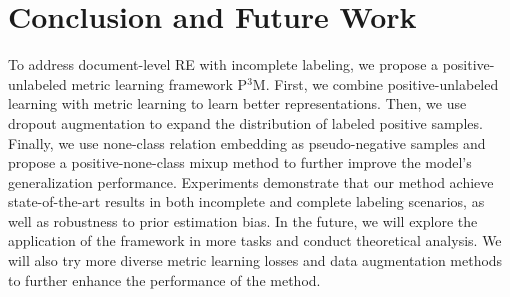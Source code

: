 \documentclass[11pt]{article}
\begin{document}






\section{Conclusion and Future Work}

To address document-level RE with incomplete labeling, we propose a positive-unlabeled metric learning framework P$^{3}$M. First, we combine positive-unlabeled learning with metric learning to learn better representations. Then, we use dropout augmentation to expand the distribution of labeled positive samples. Finally, we use none-class relation embedding as pseudo-negative samples and propose a positive-none-class mixup method to further improve the model's generalization performance. Experiments demonstrate that our method achieve state-of-the-art results in both incomplete and complete labeling scenarios, as well as robustness to prior estimation bias. In the future, we will explore the application of the framework in more tasks and conduct theoretical analysis. We will also try more diverse metric learning losses and data augmentation methods to further enhance the performance of the method.
\end{document}
